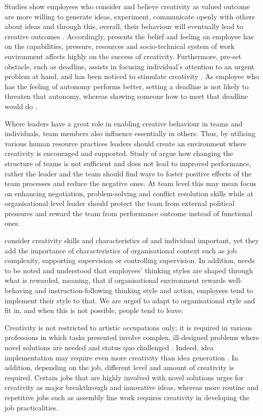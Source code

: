 Studies show employees who consider and believe creativity as valued outcome are more willing to generate ideas, experiment, communicate openly with others about ideas and through this, overall, their behaviour will eventually lead to creative outcomes \citep{shalley2004leaders}. Accordingly, \citet{csikszentmihalyi199916} presents the belief and feeling an employee has on the capabilities, pressure, resources and socio-technical system of work environment affects highly on the success of creativity. Furthermore, pre-set obstacle, such as deadline, assists in focusing individual's attention to an urgent problem at hand, and has been noticed to stimulate creativity \citep{andriopoulos2000enhancing}. As employee who has the feeling of autonomy performs better, setting a deadline is not likely to threaten that autonomy, whereas showing someone how to meet that deadline would do \citep{mumford2002leading}.

Where leaders have a great role in enabling creative behaviour in teams and individuals, team members also influence essentially in others. Thus, by utilising various human resource practices leaders should create an environment where creativity is encouraged and supported. \citep{shalley2004leaders} Study of \citet{ancona1992demography} argue how changing the structure of teams is not sufficient and does not lead to improved performance, rather the leader and the team should find ways to foster positive effects of the team processes and reduce the negative ones. At team level this may mean focus on enhancing negotiation, problem-solving and conflict resolution skills while at organisational level leader should protect the team from external political pressures and reward the team from performance outcome instead of functional ones. \citep{ancona1992demography}

\citet{oldham1996employee} consider creativity skills and characteristics of and individual important, yet they add the importance of characteristics of organisational context such as job complexity, supporting supervision or controlling supervision. In addition, needs to be noted and understood that employees' thinking styles are shaped through what is rewarded, meaning, that if organisational environment rewards well-behaving and instruction-following thinking style and action, employees tend to implement their style to that. We are urged to adapt to organisational style and fit in, and when this is not possible, people tend to leave. \citep{sternberg1997creativity}

Creativity is not restricted to artistic occupations only; it is required in various professions in which tasks presented involve complex, ill-designed problems where novel solutions are needed and status quo challenged \citep{mumford1988creativity}. Indeed, idea implementation may require even more creativity than idea generation \citep{mumford2002leading}. In addition, depending on the job, different level and amount of creativity is required. Certain jobs that are highly involved with novel solutions urges for creativity as major breakthrough and innovative ideas, whereas more routine and repetitive jobs such as assembly line work requires creativity in developing the job practicalities. \citep{shalley2004leaders} 

